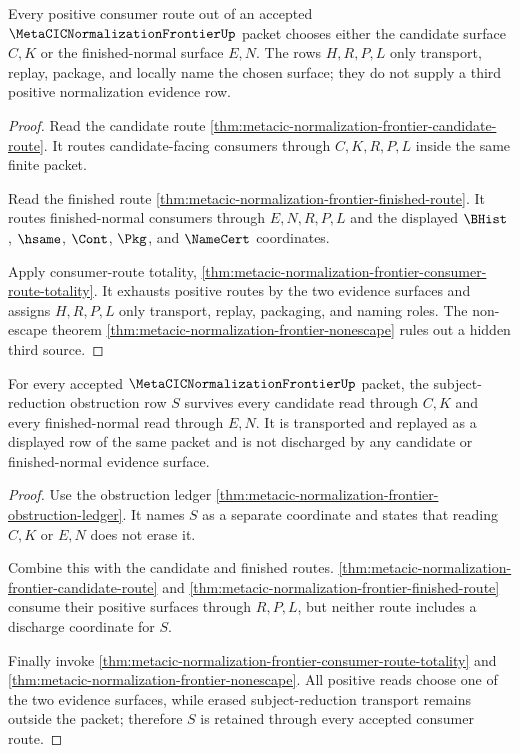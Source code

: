 \begin{theorem}
\label{thm:metacic-normalization-frontier-evidence-choice-exhaustion}
Every positive consumer route out of an accepted $\MetaCICNormalizationFrontierUp$ packet chooses either the candidate surface $C,K$ or the finished-normal surface $E,N$. The rows $H,R,P,L$ only transport, replay, package, and locally name the chosen surface; they do not supply a third positive normalization evidence row.
\end{theorem}
\begin{proof}
Read the candidate route \autoref{thm:metacic-normalization-frontier-candidate-route}. It routes candidate-facing consumers through $C,K,R,P,L$ inside the same finite packet.

Read the finished route \autoref{thm:metacic-normalization-frontier-finished-route}. It routes finished-normal consumers through $E,N,R,P,L$ and the displayed $\BHist$, $\hsame$, $\Cont$, $\Pkg$, and $\NameCert$ coordinates.

Apply consumer-route totality, \autoref{thm:metacic-normalization-frontier-consumer-route-totality}. It exhausts positive routes by the two evidence surfaces and assigns $H,R,P,L$ only transport, replay, packaging, and naming roles. The non-escape theorem \autoref{thm:metacic-normalization-frontier-nonescape} rules out a hidden third source.
\end{proof}

\begin{theorem}
\label{thm:metacic-normalization-frontier-obstruction-retention}
For every accepted $\MetaCICNormalizationFrontierUp$ packet, the subject-reduction obstruction row $S$ survives every candidate read through $C,K$ and every finished-normal read through $E,N$. It is transported and replayed as a displayed row of the same packet and is not discharged by any candidate or finished-normal evidence surface.
\end{theorem}
\begin{proof}
Use the obstruction ledger \autoref{thm:metacic-normalization-frontier-obstruction-ledger}. It names $S$ as a separate coordinate and states that reading $C,K$ or $E,N$ does not erase it.

Combine this with the candidate and finished routes. \autoref{thm:metacic-normalization-frontier-candidate-route} and \autoref{thm:metacic-normalization-frontier-finished-route} consume their positive surfaces through $R,P,L$, but neither route includes a discharge coordinate for $S$.

Finally invoke \autoref{thm:metacic-normalization-frontier-consumer-route-totality} and \autoref{thm:metacic-normalization-frontier-nonescape}. All positive reads choose one of the two evidence surfaces, while erased subject-reduction transport remains outside the packet; therefore $S$ is retained through every accepted consumer route.
\end{proof}

